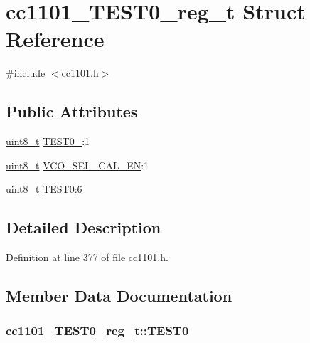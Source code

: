 \hypertarget{structcc1101___t_e_s_t0__reg__t}{}\section{cc1101\+\_\+\+T\+E\+S\+T0\+\_\+reg\+\_\+t Struct Reference}
\label{structcc1101___t_e_s_t0__reg__t}


{\ttfamily \#include $<$cc1101.\+h$>$}

\subsection*{Public Attributes}
\begin{DoxyCompactItemize}
\item 
\hyperlink{_p_e___types_8h_aba7bc1797add20fe3efdf37ced1182c5}{uint8\+\_\+t} \hyperlink{structcc1101___t_e_s_t0__reg__t_ac37d759eb50d33b3e6d705a09f9f34d6}{T\+E\+S\+T0\+\_}\+:1
\item 
\hyperlink{_p_e___types_8h_aba7bc1797add20fe3efdf37ced1182c5}{uint8\+\_\+t} \hyperlink{structcc1101___t_e_s_t0__reg__t_ab0aeb80fe05315ca78a519717dd8d5a8}{V\+C\+O\+\_\+\+S\+E\+L\+\_\+\+C\+A\+L\+\_\+\+EN}\+:1
\item 
\hyperlink{_p_e___types_8h_aba7bc1797add20fe3efdf37ced1182c5}{uint8\+\_\+t} \hyperlink{structcc1101___t_e_s_t0__reg__t_a87b9a9f496ef4ee30e1c2638fa1c39f2}{T\+E\+S\+T0}\+:6
\end{DoxyCompactItemize}


\subsection{Detailed Description}


Definition at line 377 of file cc1101.\+h.



\subsection{Member Data Documentation}
\subsubsection[{\texorpdfstring{T\+E\+S\+T0}{TEST0}}]{ cc1101\+\_\+\+T\+E\+S\+T0\+\_\+reg\+\_\+t\+::\+T\+E\+S\+T0}\hypertarget{structcc1101___t_e_s_t0__reg__t_a87b9a9f496ef4ee30e1c2638fa1c39f2}{}\label{structcc1101___t_e_s_t0__reg__t_a87b9a9f496ef4ee30e1c2638fa1c39f2}


